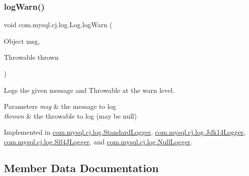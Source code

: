 \mbox{\label{interfacecom_1_1mysql_1_1cj_1_1log_1_1_log_a36af866ddfdda47938c768d3d0e68572}} 
\subsubsection{\texorpdfstring{log\+Warn()}{logWarn()}\hspace{0.1cm}{\footnotesize\ttfamily [2/2]}}
{\footnotesize\ttfamily void com.\+mysql.\+cj.\+log.\+Log.\+log\+Warn (\begin{DoxyParamCaption}\item[{Object}]{msg,  }\item[{Throwable}]{thrown }\end{DoxyParamCaption})}

Logs the given message and Throwable at the \textquotesingle{}warn\textquotesingle{} level.


\begin{DoxyParams}{Parameters}
{\em msg} & the message to log \\
\hline
{\em thrown} & the throwable to log (may be null) \\
\hline
\end{DoxyParams}


Implemented in \mbox{\hyperlink{classcom_1_1mysql_1_1cj_1_1log_1_1_standard_logger_a3e05a95a97a95afb400144f652f43c78}{com.\+mysql.\+cj.\+log.\+Standard\+Logger}}, \mbox{\hyperlink{classcom_1_1mysql_1_1cj_1_1log_1_1_jdk14_logger_ae61cfdb92166273f90bec4fbbac6374c}{com.\+mysql.\+cj.\+log.\+Jdk14\+Logger}}, \mbox{\hyperlink{classcom_1_1mysql_1_1cj_1_1log_1_1_slf4_j_logger_a617f07e2c9b52bc774d8e8ea83ace092}{com.\+mysql.\+cj.\+log.\+Slf4\+J\+Logger}}, and \mbox{\hyperlink{classcom_1_1mysql_1_1cj_1_1log_1_1_null_logger_a93b1146368f2a30e7b4c74c043c4c00e}{com.\+mysql.\+cj.\+log.\+Null\+Logger}}.



\subsection{Member Data Documentation}
\mbox{\label{interfacecom_1_1mysql_1_1cj_1_1log_1_1_log_aa34677968e5974954c41aaa7f5c6ddec}} 

